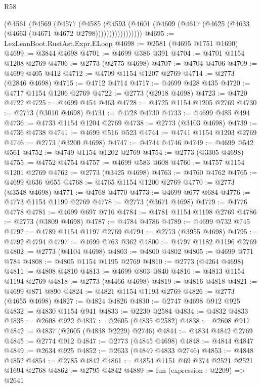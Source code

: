 \begin{lexlean}{R58}
\begin{coremodule}
              (@4561
                (@4569
                  (@4577
                    (@4585
                      (@4593
                        (@4601
                          (@4609 (@4617 (@4625 (@4633 (@4663 (@4671 @4672 @2798)))))))))))))))))
@4695 := LexLeanBoot.RustAst.Expr.ELoop
@4698 := @2581 (@4695 @1751 @1690)
@4699 := @3844 @4698
@4701 := @4699 @386 @391
@4704 := @4701 @1154 @1208 @2769
@4706 := @2773 (@2775 @4698)
@4707 := @4704 @4706
@4709 := @4699 @405 @412
@4712 := @4709 @1154 @1207 @2769
@4714 := @2773 (@2846 @4698)
@4715 := @4712 @4714
@4717 := @4699 @428 @435
@4720 := @4717 @1154 @1206 @2769
@4722 := @2773 (@2918 @4698)
@4723 := @4720 @4722
@4725 := @4699 @454 @463
@4728 := @4725 @1154 @1205 @2769
@4730 := @2773 (@3010 @4698)
@4731 := @4728 @4730
@4733 := @4699 @485 @494
@4736 := @4733 @1154 @1204 @2769
@4738 := @2773 (@3103 @4698)
@4739 := @4736 @4738
@4741 := @4699 @516 @523
@4744 := @4741 @1154 @1203 @2769
@4746 := @2773 (@3200 @4698)
@4747 := @4744 @4746
@4749 := @4699 @542 @561
@4752 := @4749 @1154 @1202 @2769
@4754 := @2773 (@3305 @4698)
@4755 := @4752 @4754
@4757 := @4699 @583 @608
@4760 := @4757 @1154 @1201 @2769
@4762 := @2773 (@3425 @4698)
@4763 := @4760 @4762
@4765 := @4699 @636 @655
@4768 := @4765 @1154 @1200 @2769
@4770 := @2773 (@3548 @4698)
@4771 := @4768 @4770
@4773 := @4699 @677 @684
@4776 := @4773 @1154 @1199 @2769
@4778 := @2773 (@3671 @4698)
@4779 := @4776 @4778
@4781 := @4699 @697 @716
@4784 := @4781 @1154 @1198 @2769
@4786 := @2773 (@3809 @4698)
@4787 := @4784 @4786
@4789 := @4699 @732 @745
@4792 := @4789 @1154 @1197 @2769
@4794 := @2773 (@3955 @4698)
@4795 := @4792 @4794
@4797 := @4699 @763 @362
@4800 := @4797 @1182 @1196 @2769
@4802 := @2773 (@4104 @4698)
@4803 := @4800 @4802
@4805 := @4699 @771 @784
@4808 := @4805 @1154 @1195 @2769
@4810 := @2773 (@4264 @4698)
@4811 := @4808 @4810
@4813 := @4699 @803 @840
@4816 := @4813 @1154 @1194 @2769
@4818 := @2773 (@4466 @4698)
@4819 := @4816 @4818
@4821 := @4699 @871 @890
@4824 := @4821 @1154 @1193 @2769
@4826 := @2773 (@4655 @4698)
@4827 := @4824 @4826
@4830 := @2747 @4698 @912 @925
@4832 := @4830 @1154 @941
@4833 := @2230 @2584
@4834 := @4832 @4833
@4835 := @2608 @922
@4837 := @2605 (@4835 @2582)
@4838 := @2608 @917
@4842 := @4837 (@2605 (@4838 @2229) @2746)
@4844 := @4834 @4842 @2769
@4845 := @2774 @912
@4847 := @2773 (@4845 @4698)
@4848 := @4844 @4847
@4849 := @2634 @925
@4852 := @2633 (@4849 @4833 @2746)
@4853 := @4848 @4852
@4854 := @2785 @4842
@4861 := @4854 @1151 @69 @374 @2521 @2521 @1694 @2768
@4862 := @2795 @4842
@4889 := fun (expression : @2209) =>
  @2641

\end{coremodule}
\end{lexlean}
